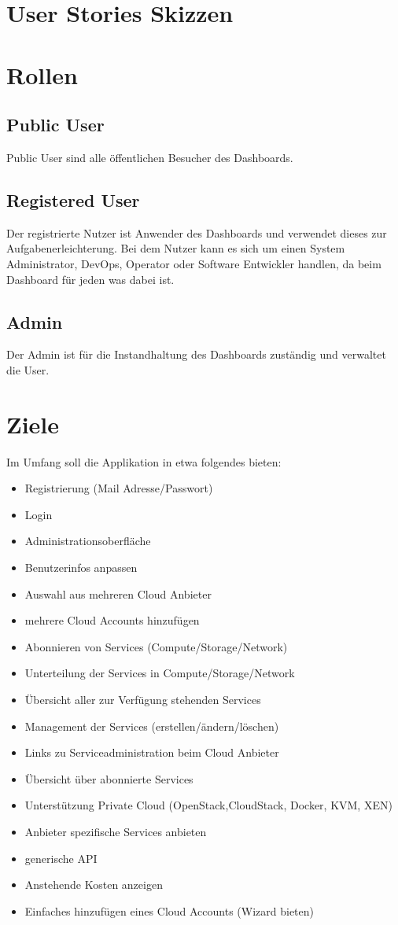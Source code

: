 \section{User Stories Skizzen}
\section{Rollen}
\subsection{Public User}
Public User sind alle öffentlichen Besucher des Dashboards.

\subsection{Registered User}
Der registrierte Nutzer ist Anwender des Dashboards und verwendet dieses zur 
Aufgabenerleichterung.
Bei dem Nutzer kann es sich um einen System Administrator, DevOps, Operator oder
Software Entwickler handlen, da beim Dashboard für jeden was dabei ist.

\subsection{Admin}
Der Admin ist für die Instandhaltung des Dashboards zuständig und verwaltet die 
User.

\section{Ziele}
Im Umfang soll die Applikation in etwa folgendes bieten:
\begin{itemize}
  \item Registrierung (Mail Adresse/Passwort)
  \item Login
  \item Administrationsoberfläche
  \item Benutzerinfos anpassen
  \item Auswahl aus mehreren Cloud Anbieter
  \item mehrere Cloud Accounts hinzufügen
  \item Abonnieren von Services (Compute/Storage/Network)
  \item Unterteilung der Services in Compute/Storage/Network
  \item Übersicht aller zur Verfügung stehenden Services
  \item Management der Services (erstellen/ändern/löschen)
  \item Links zu Serviceadministration beim Cloud Anbieter
  \item Übersicht über abonnierte Services
  \item Unterstützung Private Cloud (OpenStack,CloudStack, Docker, KVM, XEN)
  \item Anbieter spezifische Services anbieten
  \item generische API
  \item Anstehende Kosten anzeigen
  \item Einfaches hinzufügen eines Cloud Accounts (Wizard bieten)
\end{itemize}


